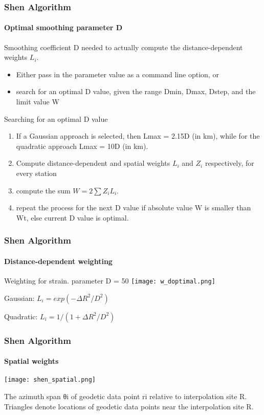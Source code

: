 \begin{frame}
  \frametitle{Shen Algorithm}
  \framesubtitle{Optimal smoothing parameter D}
  \label{ch2:}
 
  Smoothing coefficient D needed to actually compute the distance-dependent weights  $L_{i}$.
 
  \begin{itemize}
    \item Either pass in the parameter value as a command line option, or
    \item search for an optimal D value, given the range Dmin, Dmax, Dstep, and the limit value W
  \end{itemize}
  
  Searching for an optimal D value
  
  \begin{enumerate}
    \item If a Gaussian approach is selected, then Lmax = 2.15D (in km), while for the quadratic approach Lmax = 10D (in km).
    \item Compute distance-dependent and spatial weights $ L_{i} $ and $ Z_{i} $ respectively, for every station
    \item compute the sum $ W = 2\sum Z_{i} L_{i} $.
    \item repeat the process for the next D value if absolute value W is smaller than Wt, else current D value is optimal.
  \end{enumerate}
 
 

\end{frame}
\note{}

\begin{frame}
  \frametitle{Shen Algorithm}
  \framesubtitle{Distance-dependent weighting}
  \label{ch2:}
  
  \begin{center}
  Weighting for strain. parameter D = 50
    \texttt{[image: w\_doptimal.png]} 
  \end{center}
  Gaussian: $L_i = exp(-\Delta R^2/D^2) $ 
  
  Quadratic: $ L_i = 1/(1 + \Delta R^2/D^2) $
 
\end{frame}
\note{}

\begin{frame}
  \frametitle{Shen Algorithm}
  \framesubtitle{Spatial weights}
  \label{ch2:}
  
   
  \begin{center}
    \texttt{[image: shen\_spatial.png]} 
  \end{center}
  
  The azimuth span θi of geodetic data point ri relative to interpolation site R. Triangles denote locations of geodetic data points near the interpolation site R.
  
\end{frame}
\note{}


